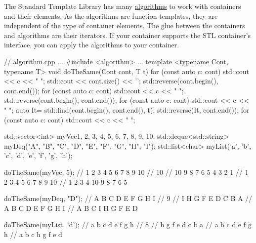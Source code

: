 
The Standard Template Library has many \href{http://en.cppreference.com/w/cpp/algorithm}{algorithms} to work with containers and their elements. As the algorithms are function templates, they are independent of the type of container elements. The glue between the containers and algorithms are their iterators. If your container supports the STL container’s interface, you can apply the algorithms to your container.


\begin{cpp}
// algorithm.cpp
...
#include <algorithm>
...
template <typename Cont, typename T>
void doTheSame(Cont cont, T t){
	for (const auto c: cont) std::cout << c << " ";
	std::cout << cont.size() << '\n';
	std::reverse(cont.begin(), cont.end());
	for (const auto c: cont) std::cout << c << " ";
	std::reverse(cont.begin(), cont.end());
	for (const auto c: cont) std::cout << c << " ";
	auto It= std::find(cont.begin(), cont.end(), t);
	std::reverse(It, cont.end());
	for (const auto c: cont) std::cout << c << " ";
}

std::vector<int> myVec{1, 2, 3, 4, 5, 6, 7, 8, 9, 10};
std::deque<std::string> myDeq({"A", "B", "C", "D", "E", "F", "G", "H", "I"});
std::list<char> myList({'a', 'b', 'c', 'd', 'e', 'f', 'g', 'h'});

doTheSame(myVec, 5);
	// 1 2 3 4 5 6 7 8 9 10
	// 10
	// 10 9 8 7 6 5 4 3 2 1
	// 1 2 3 4 5 6 7 8 9 10
	// 1 2 3 4 10 9 8 7 6 5
	
doTheSame(myDeq, "D");
	// A B C D E F G H I
	// 9
	// I H G F E D C B A
	// A B C D E F G H I
	// A B C I H G F E D
	
doTheSame(myList, 'd');
	// a b c d e f g h
	// 8
	// h g f e d c b a
	// a b c d e f g h
	// a b c h g f e d
\end{cpp}




















